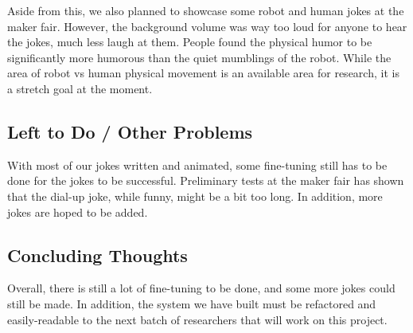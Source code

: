 \documentclass[onecolumn, draftclsnofoot,10pt, compsoc]{IEEEtran}
\begin{document}
Aside from this, we also planned to showcase some robot and human jokes at the maker fair. However, the background volume was way too loud for anyone to hear the jokes, much less laugh at them. People found the physical humor to be significantly more humorous than the quiet mumblings of the robot. While the area of robot vs human physical movement is an available area for research, it is a stretch goal at the moment.

\subsection{Left to Do / Other Problems}
With most of our jokes written and animated, some fine-tuning still has to be done for the jokes to be successful. Preliminary tests at the maker fair has shown that the dial-up joke, while funny, might be a bit too long. In addition, more jokes are hoped to be added.


\subsection{Concluding Thoughts}
Overall, there is still a lot of fine-tuning to be done, and some more jokes could still be made. In addition, the system we have built must be refactored and easily-readable to the next batch of researchers that will work on this project. 
\end{document}

